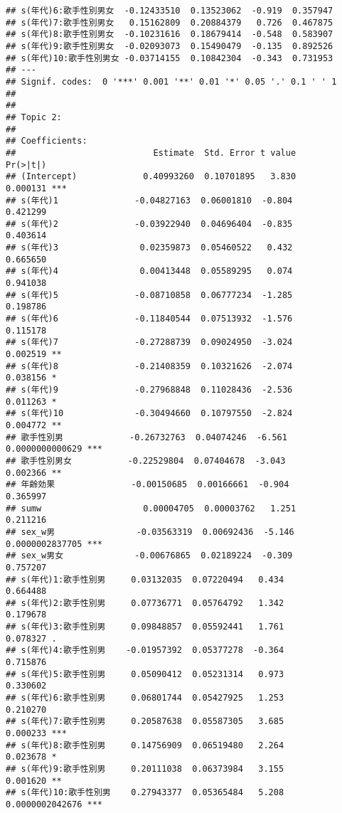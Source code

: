 \documentclass[
]{article}
\begin{document}
\begin{verbatim}
## s(年代)6:歌手性別男女  -0.12433510  0.13523062  -0.919  0.357947    
## s(年代)7:歌手性別男女   0.15162809  0.20884379   0.726  0.467875    
## s(年代)8:歌手性別男女  -0.10231616  0.18679414  -0.548  0.583907    
## s(年代)9:歌手性別男女  -0.02093073  0.15490479  -0.135  0.892526    
## s(年代)10:歌手性別男女 -0.03714155  0.10842304  -0.343  0.731953    
## ---
## Signif. codes:  0 '***' 0.001 '**' 0.01 '*' 0.05 '.' 0.1 ' ' 1
## 
## 
## Topic 2:
## 
## Coefficients:
##                           Estimate  Std. Error t value        Pr(>|t|)    
## (Intercept)             0.40993260  0.10701895   3.830        0.000131 ***
## s(年代)1               -0.04827163  0.06001810  -0.804        0.421299    
## s(年代)2               -0.03922940  0.04696404  -0.835        0.403614    
## s(年代)3                0.02359873  0.05460522   0.432        0.665650    
## s(年代)4                0.00413448  0.05589295   0.074        0.941038    
## s(年代)5               -0.08710858  0.06777234  -1.285        0.198786    
## s(年代)6               -0.11840544  0.07513932  -1.576        0.115178    
## s(年代)7               -0.27288739  0.09024950  -3.024        0.002519 ** 
## s(年代)8               -0.21408359  0.10321626  -2.074        0.038156 *  
## s(年代)9               -0.27968848  0.11028436  -2.536        0.011263 *  
## s(年代)10              -0.30494660  0.10797550  -2.824        0.004772 ** 
## 歌手性別男             -0.26732763  0.04074246  -6.561 0.0000000000629 ***
## 歌手性別男女           -0.22529804  0.07404678  -3.043        0.002366 ** 
## 年齢効果               -0.00150685  0.00166661  -0.904        0.365997    
## sumw                    0.00004705  0.00003762   1.251        0.211216    
## sex_w男                -0.03563319  0.00692436  -5.146 0.0000002837705 ***
## sex_w男女              -0.00676865  0.02189224  -0.309        0.757207    
## s(年代)1:歌手性別男     0.03132035  0.07220494   0.434        0.664488    
## s(年代)2:歌手性別男     0.07736771  0.05764792   1.342        0.179678    
## s(年代)3:歌手性別男     0.09848857  0.05592441   1.761        0.078327 .  
## s(年代)4:歌手性別男    -0.01957392  0.05377278  -0.364        0.715876    
## s(年代)5:歌手性別男     0.05090412  0.05231314   0.973        0.330602    
## s(年代)6:歌手性別男     0.06801744  0.05427925   1.253        0.210270    
## s(年代)7:歌手性別男     0.20587638  0.05587305   3.685        0.000233 ***
## s(年代)8:歌手性別男     0.14756909  0.06519480   2.264        0.023678 *  
## s(年代)9:歌手性別男     0.20111038  0.06373984   3.155        0.001620 ** 
## s(年代)10:歌手性別男    0.27943377  0.05365484   5.208 0.0000002042676 ***

\end{verbatim}
\end{document}
